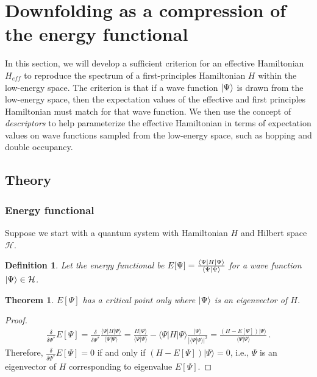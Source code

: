 \newtheorem{theorem}{Theorem}
\newtheorem{definition}{Definition}
\newtheorem{lemma}{Lemma}


\section{Downfolding as a compression of the energy functional}
\label{sec:theory}

In this section, we will develop a sufficient criterion for an effective Hamiltonian $H_{eff}$ to reproduce the spectrum of a first-principles Hamiltonian $H$ within the low-energy space. 
The criterion is that if a wave function $\ket{\Psi}$ is drawn from the low-energy space, then the expectation values of the effective and first principles Hamiltonian must match for that wave function.
We then use the concept of \textit{descriptors} to help parameterize the effective Hamiltonian in terms of expectation values on wave functions sampled from the low-energy space, such as hopping and double occupancy.

\subsection{Theory} 

\subsubsection{Energy functional}
Suppose we start with a quantum system with Hamiltonian $H$ and Hilbert space ${\mathcal H}$.

\begin{definition}
Let the energy functional be $E[\Psi] = \frac{\bra{\Psi}H\ket{\Psi}}{\braket{\Psi|\Psi}}$ for a wave function $\ket{\Psi} \in {\mathcal H}$.
\end{definition}


\begin{theorem}
\label{theorem:criticalpoint}
$E[\Psi]$ has a critical point only where $\ket{\Psi}$ is an eigenvector of $H$. 
\end{theorem}
\begin{proof}
\begin{eqnarray}
\frac{\delta }{\delta \Psi^*}  E[\Psi] = \frac{\delta}{\delta \Psi^*}\frac{\langle \Psi |H|\Psi\rangle}{\langle \Psi |\Psi\rangle} = \frac{H|\Psi\rangle}{\langle \Psi |\Psi\rangle} - \langle \Psi |H|\Psi\rangle \frac{|\Psi \rangle}{|\langle \Psi | \Psi\rangle|^2} =\frac{ (H-E[\Psi])|\Psi\rangle }{\langle\Psi|\Psi\rangle}\,.
\end{eqnarray}
Therefore, 
$\frac{\delta }{\delta \Psi^*}  E[\Psi] = 0$ if and only if $(H-E[\Psi])|\Psi\rangle =0$, i.e., $\Psi$ is an eigenvector of $H$ corresponding to eigenvalue $E[\Psi]$.  
\end{proof}

